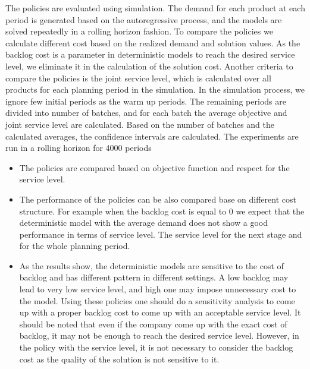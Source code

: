\documentclass[10pt]{article}
\begin{document}
The policies are evaluated  using simulation. The demand for each product at each period is generated based on the autoregressive process, and the models are solved repeatedly in a rolling horizon fashion. To compare the policies we calculate different cost based on the realized demand and solution values. As the backlog cost is a parameter in deterministic models to reach the desired service level, we eliminate it in the calculation of the solution cost. Another criteria to compare the policies is the joint service level, which is calculated over all products for each planning period in the simulation. 
In the simulation process, we ignore few initial periods as the warm up periods. The remaining periods are divided into number of batches, and for each batch the average objective and joint service level are calculated. Based on the number of batches and the calculated averages, the confidence intervals are calculated. The experiments are run in a rolling horizon for 4000 periods 

\begin{itemize}
\item The policies are compared based on objective function and respect for the service level. 
\item The performance of the policies can be also compared base on different cost structure. For example when the backlog cost is equal to 0 we expect that the deterministic model with the average demand does not show a good performance in terms of service level. The service level for the next stage and for the whole planning period.
\item As the results show, the deterministic models are sensitive to the cost of backlog and has different pattern in different settings. A low backlog may lead to very low service level, and high one may impose unnecessary cost to the model. Using these policies one should do a sensitivity analysis to come up with a proper backlog cost to come up with an acceptable service level. It should be noted that even if the company come up with the exact cost of backlog, it may not be enough to reach the desired service level. However, in the policy with the service level, it is not necessary to consider the backlog cost as the quality of the solution is not sensitive to it. 


\end{itemize}

\newcommand{\nm}[1]{\textnormal{#1}}
\end{document}
